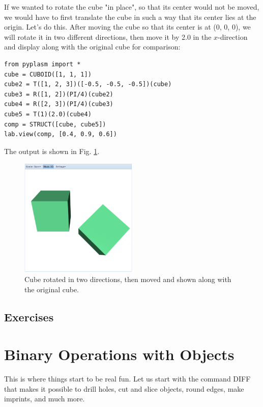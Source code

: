 \documentclass[article,A4,12pt]{llncs}
\begin{document}
If we wanted to 
rotate the cube "in place", so that its center would not be moved,
we would have to first translate the cube in such a way that its center
lies at the origin. Let's do this. After moving the cube so that 
its center is at (0, 0, 0), we will rotate it in two different directions,
then move it by 2.0 in the $x$-direction and display along with 
the original cube for comparison:

\begin{verbatim}
from pyplasm import *
cube = CUBOID([1, 1, 1])
cube2 = T([1, 2, 3])([-0.5, -0.5, -0.5])(cube)
cube3 = R([1, 2])(PI/4)(cube2)
cube4 = R([2, 3])(PI/4)(cube3)
cube5 = T(1)(2.0)(cube4)
comp = STRUCT([cube, cube5])
lab.view(comp, [0.4, 0.9, 0.6])
\end{verbatim}
The output is shown in Fig. \ref{fig:rot-2}.
\newpage

\begin{figure}[!ht]
\begin{center}
\includegraphics[width=0.5\textwidth]{img/rot-2.png}
\end{center}
\vspace{-2mm}
\caption{Cube rotated in two directions, then moved and shown along with the original cube.}
\label{fig:rot-2}
\end{figure}

\subsection{Exercises}


\section{Binary Operations with Objects}

This is where things start to be real fun. Let us start with the 
command DIFF that makes it possible to drill holes, cut and slice objects, 
round edges, make imprints, and much more.
\end{document}
